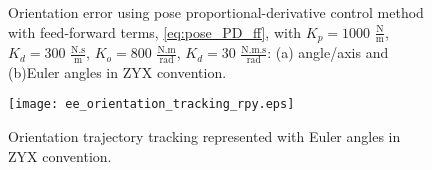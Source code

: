 \begin{figure}
    \centering
    \hfill
    \caption{Orientation error using pose proportional-derivative control method with feed-forward terms, \eqref{eq:pose_PD_ff}, with  ${K_{p}}=1000$ $\mathrm{\frac{N}{m}}$, $K_{d}= 300$ $\mathrm{\frac{N.s}{m}}$, ${K_{o}}=800$ $\mathrm{\frac{N.m}{rad}}$, $K_{d}= 30$ $\mathrm{\frac{N.m.s}{rad}}$: (a) angle/axis and (b)Euler angles in ZYX convention.}
    \label{fig:act_3.2_ee_orientation_error}
\end{figure}

\begin{figure}
	\centering
	\texttt{[image: ee\_orientation\_tracking\_rpy.eps]}
    \caption{Orientation trajectory tracking represented with Euler angles in ZYX convention.}
    \label{fig:act_3.2_ee_orientation_tracking_rpy}	
\end{figure}
